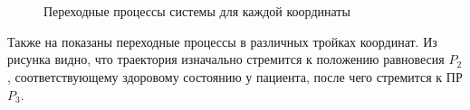 \documentclass[14pt,a4paper]{extarticle}
\begin{document}
\begin{example}
		\begin{figure}[h]
			\centering
			\\
			\\
			\caption{Переходные процессы системы для каждой координаты}
			\label{fig:in_D}
		\end{figure}
		\newpage
		
		Также на  показаны переходные процессы в различных тройках координат. Из рисунка видно, что траектория изначально стремится к положению равновесия $P_2$, соответствующему здоровому состоянию у пациента, после чего стремится к ПР $P_3$.
		

\end{example}
\end{document}
